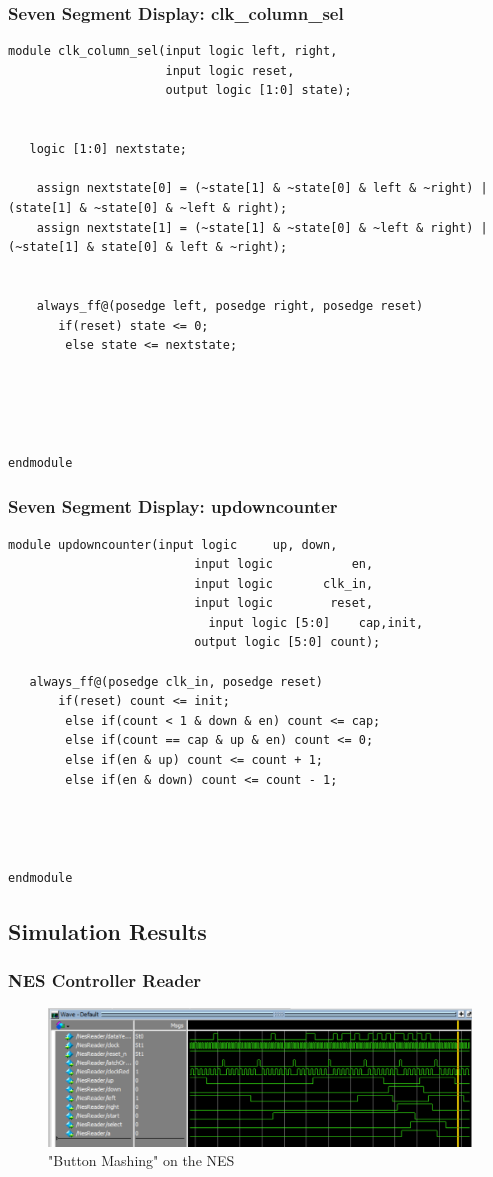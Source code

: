 \documentclass[a4paper]{article}
\begin{document}
\subsubsection{Seven Segment Display: clk_column_sel}
\begin{Verbatim}
module clk_column_sel(input logic left, right,
                      input logic reset,
                      output logic [1:0] state);
							 
							 
   logic [1:0] nextstate;
	
	assign nextstate[0] = (~state[1] & ~state[0] & left & ~right) | (state[1] & ~state[0] & ~left & right);
	assign nextstate[1] = (~state[1] & ~state[0] & ~left & right) | (~state[1] & state[0] & left & ~right);
	
	
	always_ff@(posedge left, posedge right, posedge reset)
	   if(reset) state <= 0;
		else state <= nextstate;
	   

   


endmodule 
\end{Verbatim}

\subsubsection{Seven Segment Display: updowncounter}
\begin{Verbatim}
module updowncounter(input logic     up, down,
					      input logic           en,
					      input logic       clk_in,
					      input logic        reset,
							input logic [5:0]    cap,init,
					      output logic [5:0] count);
							
   always_ff@(posedge clk_in, posedge reset)
	   if(reset) count <= init;
		else if(count < 1 & down & en) count <= cap;
		else if(count == cap & up & en) count <= 0;
		else if(en & up) count <= count + 1;
		else if(en & down) count <= count - 1;
						 
   
	

endmodule 
\end{Verbatim}

\subsection{Simulation Results}%

\subsubsection{NES Controller Reader}
\begin{figure}[H]
    \includegraphics[width=0.8 \linewidth]{images/NESSIM.png}
    \caption{"Button Mashing" on the NES}
    \label{nesButtonMash}
\end{figure}
\end{document}
